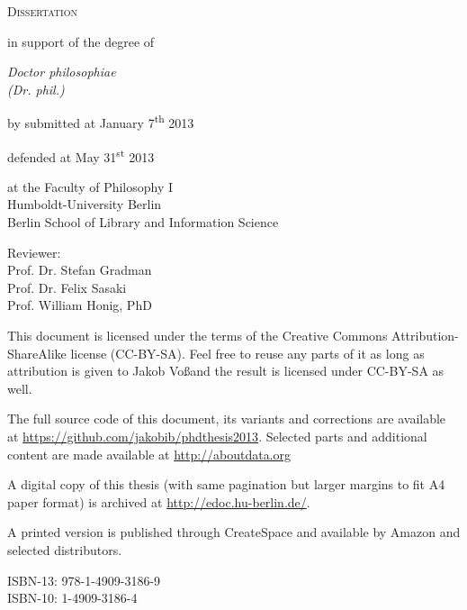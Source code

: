 
\renewcommand{\thepage}{\roman{page}}

\makeatletter

\begin{titlepage}

\begin{center}
\vfill

{\bfseries
  {\huge\strut\ignorespaces\@title\par}
  {\large\strut\ignorespaces\@subtitle\par}
}\vfill

{\huge\textsc{Dissertation}}\par
{\large in support of the degree of\par
{}\baselineskip
{\it Doctor philosophiae\\(Dr. phil.)} \par
{}\baselineskip
by \@author
{}\baselineskip
submitted at January 7\textsuperscript{th} 2013\par
defended at May 31\textsuperscript{st} 2013\par
{}\baselineskip
at the Faculty of Philosophy I\\
Humboldt-University Berlin\\
Berlin School of Library and Information Science\par
{}\baselineskip
Reviewer:\\
Prof. Dr. Stefan Gradman \\
Prof. Dr. Felix Sasaki \\
Prof. William Honig, PhD
}
\end{center}

\pagebreak
\thispagestyle{empty}
\vfill

\noindent This document is licensed under the terms of the Creative Commons
Attribution-ShareAlike license (CC-BY-SA). Feel free to reuse any parts of it
as long as attribution is given to Jakob Vo\ss and the result is licensed under
CC-BY-SA as well.

\baselineskip

\noindent
The full source code of this document, its variants and corrections are
available at \url{https://github.com/jakobib/phdthesis2013}.  Selected parts
and additional content are made available at \url{http://aboutdata.org}

\baselineskip

\noindent
A digital copy of this thesis (with same pagination but larger margins to fit
A4 paper format) is archived at \url{http://edoc.hu-berlin.de/}.

\baselineskip

\noindent
A printed version is published through CreateSpace and available by Amazon and
selected distributors.

\baselineskip

\noindent
ISBN-13: 978-1-4909-3186-9\\
ISBN-10: 1-4909-3186-4
\end{titlepage}

\makeatother
